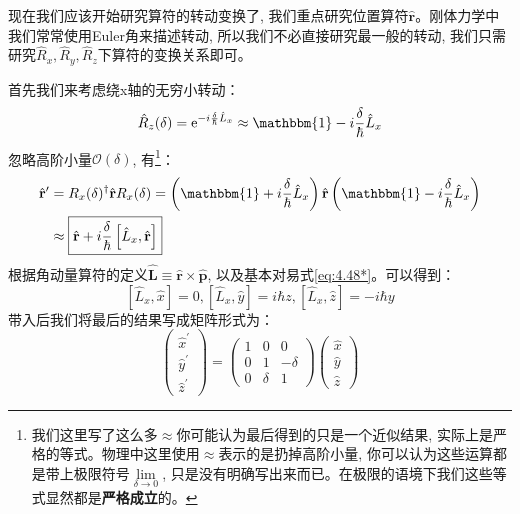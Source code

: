 现在我们应该开始研究算符的转动变换了, 我们重点研究位置算符$\hat{\mathbf{r}}$。刚体力学中我们常常使用Euler角来描述转动, 所以我们不必直接研究最一般的转动, 我们只需研究$\hat{R}_x,\hat{R}_y,\hat{R}_z$下算符的变换关系即可。

首先我们来考虑绕x轴的无穷小转动：
\begin{equation}
    \hat{R}_z(\delta)=\mathrm e^{-i\frac{\delta}{\hbar}\hat{L}_x}\approx\mathbbm{1}-i\frac{\delta}{\hbar}\hat{L}_x
\end{equation}
忽略高阶小量$\mathcal{O}(\delta)$, 有\footnote{我们这里写了这么多$\approx$你可能认为最后得到的只是一个近似结果, 实际上是严格的等式。物理中这里使用$\approx$表示的是扔掉高阶小量, 你可以认为这些运算都是带上极限符号$\lim\limits_{\delta\to0}$, 只是没有明确写出来而已。在极限的语境下我们这些等式显然都是\textbf{严格成立}的。}：
\begin{align}
    \hat{\mathbf{r}}^\prime&=R_x(\delta)^\dagger\hat{\mathbf{r}}R_x(\delta)=\left(\mathbbm{1}+i\frac{\delta}{\hbar}\hat{L}_x\right)\hat{\mathbf{r}}\left(\mathbbm{1}-i\frac{\delta}{\hbar}\hat{L}_x\right)\\
    &\approx\boxed{\hat{\mathbf{r}}+i\frac{\delta}{\hbar}\left[\hat{L}_x,\hat{\mathbf{r}}\right]}
\end{align}
根据角动量算符的定义$\hat{\mathbf{L}}\equiv\hat{\mathbf{r}}\times\hat{\mathbf{p}}$, 以及基本对易式\ref{eq:4.48*}。可以得到：
\begin{equation}
    \left[\hat{L}_x,\hat{x}\right]=0,\left[\hat{L}_x,\hat{y}\right]=i\hbar z,\left[\hat{L}_x,\hat{z}\right]=-i\hbar y
\end{equation}
带入后我们将最后的结果写成矩阵形式为：
\begin{equation}
    \label{eq:6.34}
    \left(\begin{array}{l}
        \hat{x}^{\prime} \\
        \hat{y}^{\prime} \\
        \hat{z}^{\prime}
        \end{array}\right)=\left(\begin{array}{ccc}
        1 & 0 & 0 \\
        0 & 1 & -\delta \\
        0 & \delta & 1
        \end{array}\right)\left(\begin{array}{l}
        \hat{x} \\
        \hat{y} \\
        \hat{z}
        \end{array}\right)
\end{equation}

